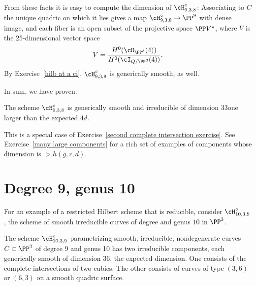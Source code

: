 From these facts it is easy to compute the dimension of
$\cH^\circ_{9,3,8}$: Associating to $C$ the unique quadric on which it
lies gives a map $\cH^\circ_{9,3,8} \to \PP^9$ with dense image, and
each fiber is an open subset of the projective space $\PP V` `$, where $V$
is the 25-dimensional vector space
$$
V = \frac{H^0(\cO_{\PP^3}(4))}{H^0(\cI_{Q/\PP^3}(4))}.
$$
By Exercise~\ref{hilb at a ci}, $\cH^\circ_{9,3,8}$ is generically smooth,
as well.

In sum, we have proven:
\begin{proposition}
 The scheme $\cH^\circ_{9,3,8}$ is generically smooth and irreducible
 of dimension $33$\emdash one larger than the expected $4d$.
\end{proposition}

This is a special case of Exercise~\ref{second complete intersection
exercise}.
See Exercise~\ref{many large components} for a rich set of examples of
components whose dimension
is $>h(g,r,d)$.

\section{Degree 9, genus 10}\label{deg9 section}

For an example of a restricted Hilbert scheme that is reducible, consider
$\cH^\circ_{10,3,9}$, the
%
scheme of smooth irreducible curves of degree \9 and genus $10$ in $\PP^{3}$.

\begin{proposition}\label{types of 10,3,9}
 The scheme $\cH^\circ_{10,3,9}$
parametrizing
smooth, irreducible, nondegenerate
 curves $C \subset \PP^3$ of degree 9 and genus 10 has two irreducible
 components, each generically smooth of dimension 36, the expected
 dimension. One consists of the complete intersections of two cubics. The
 other consists of curves of type $(3,6)$ or $(6,3)$ on a smooth quadric
 surface. \end{proposition}

